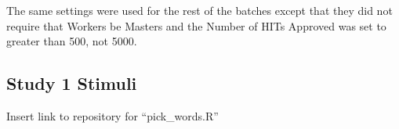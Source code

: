 \documentclass[man]{apa6}
\begin{document}
The same settings were used for the rest of the batches except that they did not require that Workers be Masters and the Number of HITs Approved was set to greater than 500, not 5000.

\hypertarget{study-1-stimuli}{%
\subsection{Study 1 Stimuli}\label{study-1-stimuli}}

Insert link to repository for \enquote{pick\_words.R}
\end{document}
